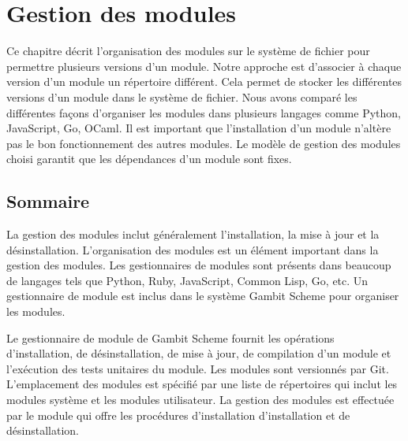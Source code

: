 
\chapter{Gestion des modules}
\label{ch:module_management}


Ce chapitre décrit l'organisation des modules sur le système de fichier pour
permettre plusieurs versions d'un module. Notre approche est d'associer à
chaque version d'un module un répertoire différent. Cela permet de stocker les
différentes versions d'un module dans le système de fichier.  Nous avons
comparé les différentes façons d'organiser les modules dans plusieurs langages
comme Python, JavaScript, Go, OCaml. Il est important que l'installation d'un
module n'altère pas le bon fonctionnement des autres modules.  Le modèle de gestion des
modules choisi garantit que les dépendances d'un module sont fixes.

\section{Sommaire}
La gestion des modules inclut généralement l'installation, la mise à jour et
la désinstallation. L'organisation des modules est un élément important
dans la gestion des modules. Les gestionnaires de modules sont présents dans
beaucoup de langages tels que Python, Ruby, JavaScript, Common Lisp, Go, etc.
Un gestionnaire de module est inclus dans le système Gambit Scheme pour
organiser les modules.

Le gestionnaire de module de Gambit Scheme fournit les opérations
d'installation, de désinstallation, de mise à jour, de compilation
d'un module et l'exécution des tests unitaires du module. Les modules
sont versionnés par Git. L'emplacement des modules est spécifié par
une liste de répertoires qui inclut les modules système et les modules
utilisateur. La gestion des modules est effectuée par le module 
qui offre les procédures d'installation d'installation et de désinstallation.




